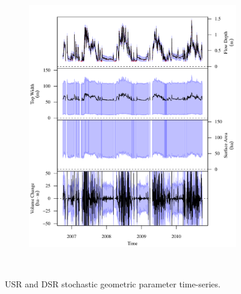 \begin{linenumbers}
\begin{landscape}
\begin{figure}
\begin{subfigure}{0.7\textwidth}
			\includegraphics[width=\textwidth]{"Figures/Results_USR/Stochastic/G TS D"}
			\label{sub:GeoTS_D}
		\end{subfigure}\\
		\caption{USR and DSR stochastic geometric parameter time-series.}
	\end{figure}
\end{landscape}


\end{linenumbers}
